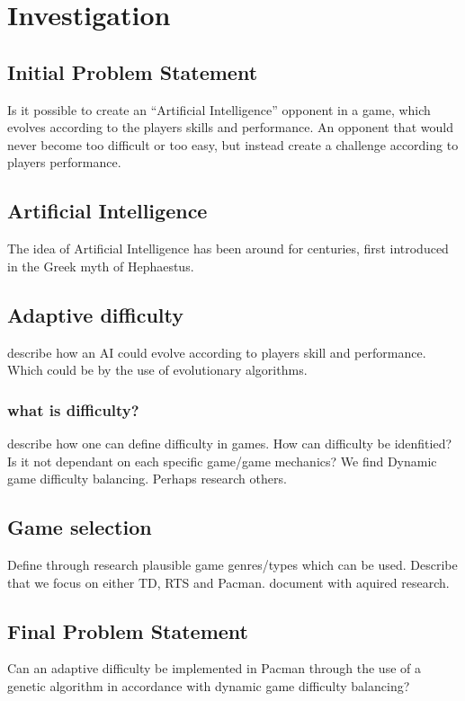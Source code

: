\section{Investigation} \label{sec:preanalysus}

\subsection{Initial Problem Statement} \label{sec:initialproblemstatement}
Is it possible to create an “Artificial Intelligence” opponent in a game, which evolves according to the players skills and performance.  An opponent that would never become too difficult or too easy, but instead create a challenge according to players performance.


\subsection{Artificial Intelligence} \label{sec:ai}
The idea of Artificial Intelligence has been around for centuries, first introduced in the Greek myth of Hephaestus. 

\subsection{Adaptive difficulty}
describe how an AI could evolve according to players skill and performance. Which could be by the use of evolutionary algorithms.
\subsubsection{what is difficulty?}
describe how one can define difficulty in games. How can difficulty be idenfitied? Is it not dependant on each specific game/game mechanics?
We find Dynamic game difficulty balancing. Perhaps research others.
\subsection{Game selection}
Define through research plausible game genres/types which can be used.
Describe that we focus on either TD, RTS and Pacman. document with aquired research.




\subsection{Final Problem Statement} \label{sec:finalproblemstatement}
Can an adaptive difficulty 	be implemented in Pacman through the use of a genetic algorithm in accordance with dynamic game difficulty balancing?